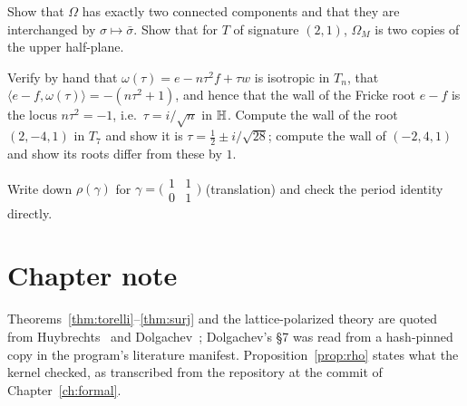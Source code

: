 \begin{exercise}
Show that $\Omega$ has exactly two connected components and that they are
interchanged by $\sigma\mapsto\bar\sigma$. Show that for $T$ of signature
$(2,1)$, $\Omega_M$ is two copies of the upper half-plane.
\end{exercise}

\begin{exercise}[$\star$]
Verify by hand that $\omega(\tau)=e-n\tau^2f+\tau w$ is isotropic in $T_n$,
that $\langle e-f,\omega(\tau)\rangle=-(n\tau^2+1)$, and hence that the wall
of the Fricke root $e-f$ is the locus $n\tau^2=-1$, i.e.\ $\tau=i/\sqrt n$ in
$\mathbb{H}$. Compute the wall of the root $(2,-4,1)$ in $T_7$ and show it is
$\tau=\tfrac12\pm i/\sqrt{28}$; compute the wall of $(-2,4,1)$ and show its
roots differ from these by $1$.
\end{exercise}

\begin{exercise}
Write down $\rho(\gamma)$ for
$\gamma=\bigl(\begin{smallmatrix}1&1\\0&1\end{smallmatrix}\bigr)$ (translation)
and check the period identity directly.
\end{exercise}

\section*{Chapter note}

Theorems~\ref{thm:torelli}--\ref{thm:surj} and the lattice-polarized theory
are quoted from Huybrechts~\cite{Huybrechts2016} and Dolgachev~\cite{Dolgachev1996};
Dolgachev's \S7 was read from a hash-pinned copy in the program's literature
manifest. Proposition~\ref{prop:rho} states what the kernel checked, as
transcribed from the repository at the commit of Chapter~\ref{ch:formal}.
